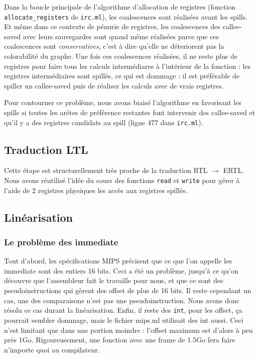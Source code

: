 \documentclass[a4paper]{article}
\begin{document}
Dans la boucle principale
de l'algorithme d'allocation de registres (fonction \texttt{allocate\_registers} de \texttt{irc.ml}), les coalescences
sont réalisées avant les spills. Et même dans ce contexte de pénurie de registres, les coalescences des callee-saved avec
leurs sauvegardes sont quand même réalisées parce que ces coalescences sont \emph{conservatives}, c'est à dire
qu'elle ne déteriorent pas la colorabilité du graphe.
Une fois ces coalescences réalisées, il ne reste plus de registres pour faire tous les calculs intermédiares à l'intérieur
de la fonction : les registres intermédiaires sont spillés, ce qui est dommage : il est préférable de spiller un callee-saved
puis de réaliser les calculs avec de vrais registres.

Pour contourner ce problème, nous avons biaisé l'algorithme en favorisant les spills si toutes les arêtes de préférence
restantes font intervenir des callee-saved et qu'il y a des registres candidats au spill (ligne 477 dans \texttt{irc.ml}).

\subsection{Traduction LTL}

Cette étape est structurellement très proche de la traduction RTL $\rightarrow$ ERTL.
Nous avons réutilisé l'idée du cours des fonctions \texttt{read} et
\texttt{write} pour gérer à l'aide de 2 registres physiques
les accès aux registres spillés. 

\subsection{Linéarisation}

\subsubsection{Le problème des immediate}
Tout d'abord, les spécifications MIPS précisent que ce que l'on appelle
les
 immediate sont des entiers 16 bits. Ceci a été un problème, jusqu'à ce
 qu'on découvre que l'assembleur fait le travaille pour nous, et que ce
 sont des pseudoinstructions qui gèrent des offset de plus de 16 bits.
 Il reste cependant un cas, une des comparaisons n'est pas une
 pseudoinstruction. Nous avons donc résolu ce cas durant la linéarisation.
Enfin, il reste des \texttt{int}, pour les offset, ça pourrait sembler
dommage, mais le fichier mips.ml utilisait des int aussi. Ceci
n'est limitant que dans une portion moindre : l'offset maximum est
d'alors à peu près 1Go. Rigoureusement, une fonction avec une frame de 1.5Go fera
faire n'importe quoi au compilateur.
\end{document}
